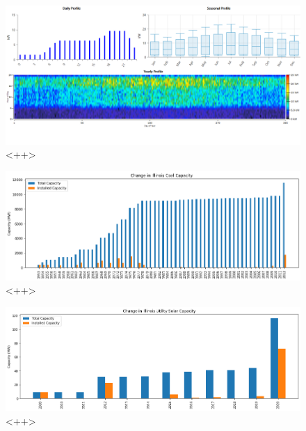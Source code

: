 \begin{figure}[ht]
	\centering
	\includegraphics[width=\columnwidth]{./img/homer_illinois_loadprofile.png}
	\caption{<++>} 
        \label{fig:bau}
\end{figure}


\begin{figure}[ht]
	\centering
	\includegraphics[width=\columnwidth]{./img/annual_installed_cap_coal.png}
	\caption{<++>}
	\label{fig:bau}
\end{figure}


\begin{figure}[ht]
	\centering
	\includegraphics[width=\columnwidth]{./img/annual_installed_cap_utilityPV.png}
	\caption{<++>}
	\label{fig:bau}
\end{figure}


